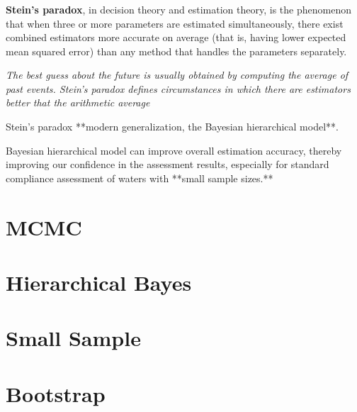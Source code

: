 \documentclass[c, dvipsnames]{beamer}  %
\begin{document}
\begin{frame}[shrink=5]
\frametitle{\insertsection} 
\framesubtitle{\insertsubsection}
 
 
\textbf{Stein's  paradox}, in decision theory and estimation theory, is the phenomenon that when three or more parameters are estimated simultaneously, there exist combined estimators more accurate on average (that is, having lower expected mean squared error) than any method that handles the parameters separately. 

\textit{The best guess about the future is usually  obtained by computing the average of past events. Stein's paradox defines circumstances in which there are estimators better that the arithmetic average
}

Stein’s paradox  **modern generalization, the Bayesian hierarchical model**. 

Bayesian hierarchical model can improve overall estimation accuracy, thereby improving our confidence in the assessment results, especially for standard compliance assessment of waters with **small sample sizes.**


\end{frame}
 
\section{MCMC}
 
 
\section{Hierarchical Bayes}




\section{Small Sample}

%
%
%
%
%


\section{Bootstrap}
\end{document}
